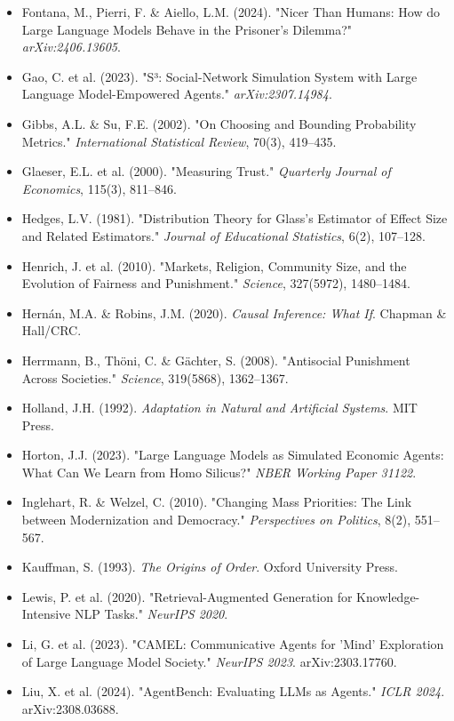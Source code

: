 \begin{itemize}
\item Fontana, M., Pierri, F. \& Aiello, L.M. (2024). "Nicer Than Humans: How do Large Language Models Behave in the Prisoner's Dilemma?" \textit{arXiv:2406.13605}.
\item Gao, C. et al. (2023). "S³: Social-Network Simulation System with Large Language Model-Empowered Agents." \textit{arXiv:2307.14984}.
\item Gibbs, A.L. \& Su, F.E. (2002). "On Choosing and Bounding Probability Metrics." \textit{International Statistical Review}, 70(3), 419–435.
\item Glaeser, E.L. et al. (2000). "Measuring Trust." \textit{Quarterly Journal of Economics}, 115(3), 811–846.
\item Hedges, L.V. (1981). "Distribution Theory for Glass's Estimator of Effect Size and Related Estimators." \textit{Journal of Educational Statistics}, 6(2), 107–128.
\item Henrich, J. et al. (2010). "Markets, Religion, Community Size, and the Evolution of Fairness and Punishment." \textit{Science}, 327(5972), 1480–1484.
\item Hernán, M.A. \& Robins, J.M. (2020). \textit{Causal Inference: What If}. Chapman \& Hall/CRC.
\item Herrmann, B., Thöni, C. \& Gächter, S. (2008). "Antisocial Punishment Across Societies." \textit{Science}, 319(5868), 1362–1367.
\item Holland, J.H. (1992). \textit{Adaptation in Natural and Artificial Systems}. MIT Press.
\item Horton, J.J. (2023). "Large Language Models as Simulated Economic Agents: What Can We Learn from Homo Silicus?" \textit{NBER Working Paper 31122}.
\item Inglehart, R. \& Welzel, C. (2010). "Changing Mass Priorities: The Link between Modernization and Democracy." \textit{Perspectives on Politics}, 8(2), 551–567.
\item Kauffman, S. (1993). \textit{The Origins of Order}. Oxford University Press.
\item Lewis, P. et al. (2020). "Retrieval-Augmented Generation for Knowledge-Intensive NLP Tasks." \textit{NeurIPS 2020}.
\item Li, G. et al. (2023). "CAMEL: Communicative Agents for 'Mind' Exploration of Large Language Model Society." \textit{NeurIPS 2023}. arXiv:2303.17760.
\item Liu, X. et al. (2024). "AgentBench: Evaluating LLMs as Agents." \textit{ICLR 2024}. arXiv:2308.03688.

\end{itemize}
